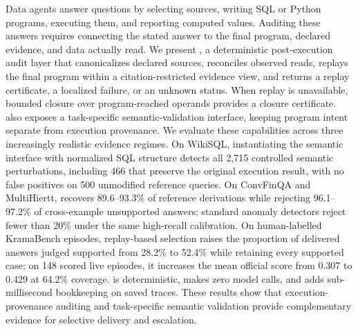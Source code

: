 Data agents answer questions by selecting sources, writing SQL or Python
programs, executing them, and reporting computed values. Auditing these
answers requires connecting the stated answer to the final program, declared
evidence, and data actually read. We present \ledger, a deterministic
post-execution audit layer that canonicalizes declared sources, reconciles
observed reads, replays the final program within a citation-restricted evidence
view, and returns a replay certificate, a localized failure, or an unknown
status. When replay is unavailable, bounded closure over program-reached
operands provides a closure certificate. \ledger also exposes a task-specific
semantic-validation interface, keeping program intent separate from execution
provenance.
We evaluate these capabilities across three increasingly realistic evidence
regimes. On WikiSQL, instantiating the semantic interface with normalized SQL
structure detects all 2,715 controlled semantic perturbations, including 466
that preserve the original execution result, with no false positives on 500
unmodified reference queries. On ConvFinQA and MultiHiertt, \ledger recovers
89.6--93.3\% of reference derivations while rejecting 96.1--97.2\% of
cross-example unsupported answers; standard anomaly detectors reject fewer
than 20\% under the same high-recall calibration. On human-labelled
KramaBench episodes, replay-based selection raises the proportion of delivered
answers judged supported from 28.2\% to 52.4\% while retaining every supported
case; on 148 scored live episodes, it increases the mean official score from
0.307 to 0.429 at 64.2\% coverage. \ledger is deterministic, makes zero model
calls, and adds sub-millisecond bookkeeping on saved traces. These results
show that execution-provenance auditing and task-specific semantic validation
provide complementary evidence for selective delivery and escalation.
